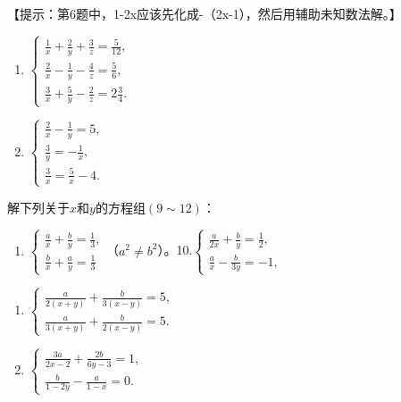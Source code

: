 【提示：第6题中，1-2x应该先化成-（2x-1），然后用辅助未知数法解。】

\begin{enumerate}[start=7]
\item
  \(\left\{ \begin{array}{l} \frac{1}{x} + \frac{2}{y} + \frac{3}{z} = \frac{5}{12}, \\ \frac{2}{x} - \frac{1}{y} - \frac{4}{z} = \frac{5}{6}, \\ \frac{3}{x} + \frac{5}{y} - \frac{2}{z} = 2\frac{3}{4}. \end{array} \right.\)
\item
  \(\left\{ \begin{array}{l} \frac{2}{x} - \frac{1}{y} = 5, \\ \frac{3}{y} = -\frac{1}{x}, \\ \frac{3}{x} = \frac{5}{x} - 4. \end{array} \right.\)
\end{enumerate}

解下列关于\(x\)和\(y\)的方程组\((9\sim 12)\)：

\begin{enumerate}[start=9]
\item
  \(\left\{ \begin{array}{l} \frac{a}{x} + \frac{b}{y} = \frac{1}{3}, \\ \frac{b}{x} + \frac{a}{y} = \frac{1}{3} \end{array} \right.\)（\(a^2 \neq b^2\)）。10.\(\left\{ \begin{array}{l} \frac{a}{2x} + \frac{b}{y} = \frac{1}{2}, \\ \frac{a}{x} - \frac{b}{3y} = -1, \end{array} \right.\)
\end{enumerate}

\begin{enumerate}[start=11]
\item
  \(\left\{ \begin{array}{l} \frac{a}{2(x + y)} + \frac{b}{3(x - y)} = 5, \\ \frac{a}{3(x + y)} + \frac{b}{2(x - y)} = 5. \end{array} \right.\)
\item
  \(\left\{ \begin{array}{l} \frac{3a}{2x - 2} + \frac{2b}{6y - 3} = 1, \\ \frac{b}{1 - 2y} - \frac{a}{1 - x} = 0. \end{array} \right.\)
\end{enumerate}

